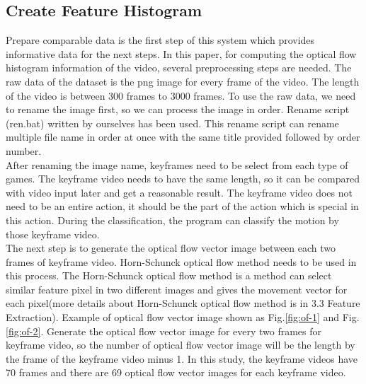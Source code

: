 \documentclass[runningheads,a4paper]{llncs}
\begin{document}
	\subsection{Create Feature Histogram}
		Prepare comparable data is the first step of this system which provides informative data for the next steps. In this paper, for computing the optical flow histogram information of the video, several preprocessing steps are needed. The raw data of the dataset is the png image for every frame of the video. The length of the video is between 300 frames to 3000 frames. To use the raw data, we need to rename the image first, so we can process the image in order. Rename script (ren.bat) written by ourselves has been used. This rename script can rename multiple file name in order at once with the same title provided followed by order number.\\
		After renaming the image name, keyframes need to be select from each type of games. The keyframe video needs to have the same length, so it can be compared with video input later and get a reasonable result. The keyframe video does not need to be an entire action, it should be the part of the action which is special in this action. During the classification, the program can classify the motion by those keyframe video.\\
		The next step is to generate the optical flow vector image between each two frames of keyframe video. Horn-Schunck optical flow method needs to be used in this process. The Horn-Schunck optical flow method is a method can select similar feature pixel in two different images and gives the movement vector for each pixel(more details about Horn-Schunck optical flow method is in 3.3 Feature Extraction). Example of optical flow vector image shown as Fig.\ref{fig:of-1} and Fig.\ref{fig:of-2}. Generate the optical flow vector image for every two frames for keyframe video, so the number of optical flow vector image will be the length by the frame of the keyframe video minus 1. In this study, the keyframe videos have 70 frames and there are 69 optical flow vector images for each keyframe video.
\end{document}
